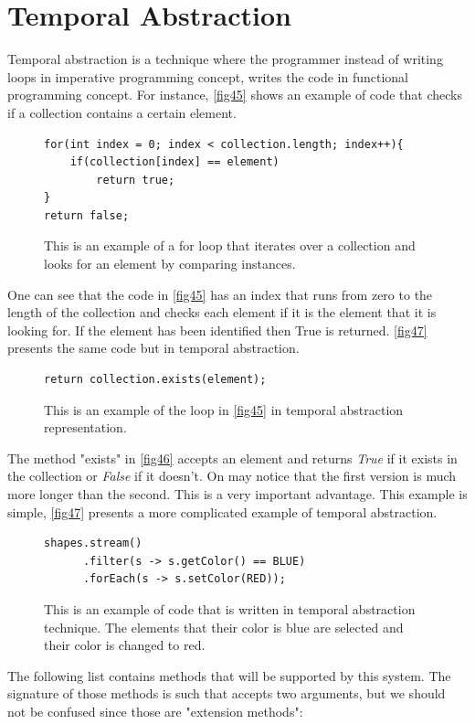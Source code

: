 \section{Temporal Abstraction} \label{sec:Temporal Abstraction}
Temporal abstraction is a technique where the programmer instead of writing loops in imperative programming concept, writes the code in functional programming concept. For instance, \autoref{fig45} shows an example of code that checks if a collection contains a certain element.
\begin{figure}[H]
\begin{lstlisting}
for(int index = 0; index < collection.length; index++){
	if(collection[index] == element)
		return true;
}
return false;
\end{lstlisting}
\caption{This is an example of a for loop that iterates over a collection and looks for an element by comparing instances.}
\label{fig45}
\end{figure}
One can see that the code in \autoref{fig45} has an index that runs from zero to the length of the collection and checks each element if it is the element that it is looking for. If the element has been identified then True is returned. \autoref{fig47} presents the same code but in temporal abstraction.
\begin{figure}[H]
\begin{lstlisting}
return collection.exists(element);
\end{lstlisting}
\caption{This is an example of the loop in \autoref{fig45} in temporal abstraction representation.}
\label{fig46}
\end{figure}
The method "exists" in \autoref{fig46} accepts an element and returns \textit{True} if it exists in the collection or \textit{False} if it doesn't. On may notice that the first version is much more longer than the second. This is a very important advantage. This example is simple, \autoref{fig47} presents a more complicated example of temporal abstraction.
\begin{figure}[H]
\begin{lstlisting}
shapes.stream()
      .filter(s -> s.getColor() == BLUE)
      .forEach(s -> s.setColor(RED));
\end{lstlisting}
\caption{This is an example of code that is written in temporal abstraction technique. The elements that their color is blue are selected and their color is changed to red.}
\label{fig47}
\end{figure}
The following list contains methods that will be supported by this system. The signature of those methods is such that accepts two arguments, but we should not be confused since those are "extension methods":
